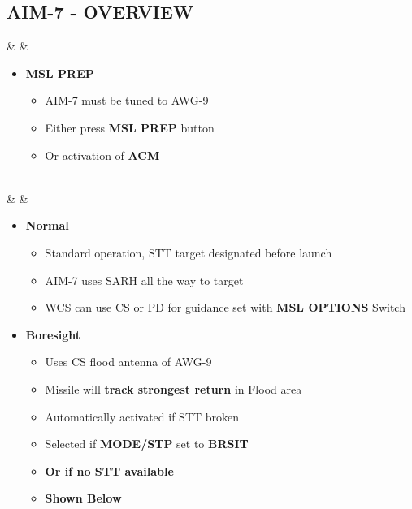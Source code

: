 \documentclass[fontInter]{TechCheck}
\begin{document}
	\subsection{AIM-7 - OVERVIEW}
	\begin{listlongtable}
		\textbf{\textbullet} &  \hfill \null {} \thumbnar &
		\begin{minipage}[t]{\linewidth}
			\vspace{-7pt}
			\begin{itemize}
				\item \textbf{MSL PREP}
				\begin{itemize}
					\item AIM-7 must be tuned to AWG-9
					\item Either press \textbf{MSL PREP} button
					\item Or activation of \textbf{ACM}
				\end{itemize}
			\end{itemize}
		\end{minipage} \\
		\midrule
		\textbf{\textbullet} &  &
		\begin{minipage}[t]{\linewidth}
			\vspace{-7pt}
			\begin{itemize}
				\item \textbf{Normal}
				\begin{itemize}
					\item Standard operation, STT target designated before launch
					\item AIM-7 uses SARH all the way to target
					\item WCS can use CS or PD for guidance set with \textbf{MSL OPTIONS} Switch
				\end{itemize}
				\item \textbf{Boresight}
				\begin{itemize}
					\item Uses CS flood antenna of AWG-9
					\item Missile will \textbf{track strongest return} in Flood area
					\item Automatically activated if STT broken
					\item Selected if \textbf{MODE/STP} set to \textbf{BRSIT}
					\item \textbf{Or if no STT available}
					\item \textbf{Shown Below}
				\end{itemize}
			\end{itemize}

\end{minipage}
\end{listlongtable}
\end{document}
